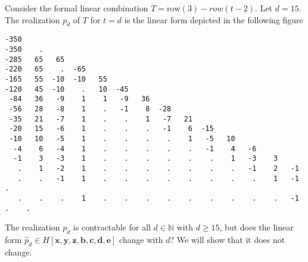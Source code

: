 \begin{example}
    Consider the formal linear combination \( T = \mathrm{row}(3) - row(t - 2) \). Let \( d = 15 \). The realization \( p_d \) of \( T \) for \( t = d \) is the linear form depicted in the following figure
    \begin{verbatim}
-350 
-350    . 
-285   65   65 
-220   65    .  -65 
-165   55  -10  -10   55 
-120   45  -10    .   10  -45 
 -84   36   -9    1    1   -9   36 
 -56   28   -8    1    .   -1    8  -28 
 -35   21   -7    1    .    .    1   -7   21 
 -20   15   -6    1    .    .    .   -1    6  -15 
 -10   10   -5    1    .    .    .    .    1   -5   10 
  -4    6   -4    1    .    .    .    .    .   -1    4   -6 
  -1    3   -3    1    .    .    .    .    .    .    1   -3    3 
   .    1   -2    1    .    .    .    .    .    .    .   -1    2   -1 
   .    .   -1    1    .    .    .    .    .    .    .    .    1   -1    . 
   .    .    .    1    .    .    .    .    .    .    .    .    .   -1    .    .         
    \end{verbatim}
    The realization \( p_d \) is contractable for all \( d \in \mathbb{N} \) with \( d \geq 15 \), but does the linear form \( \hat p_d \in H[\mathbf{x}, \mathbf{y}, \mathbf{z}, \mathbf{b}, \mathbf{c}, \mathbf{d}, \mathbf{e}]\) change with \( d \)? We will show that it does not change.
\end{example}

